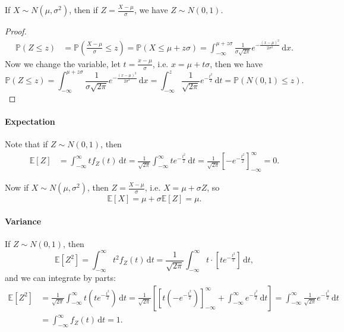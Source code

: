 \begin{claim}
    If \(X \sim N(\mu , \sigma ^2)\), then if \(Z = \frac{X - \mu}{\sigma}\), we have \(Z \sim N(0, 1)\).   
\end{claim}

\begin{proof}
    \begin{align*}
        \mathbb{P} (Z \le z) &= \mathbb{P} \left( \frac{X - \mu}{\sigma} \le z \right) = \mathbb{P} (X \le \mu + z \sigma) = \int _{-\infty }^{\mu + z \sigma} \frac{1}{\sigma \sqrt{2 \pi} } e^{-\frac{(x - \mu )^2}{2 \sigma ^2}} \, \mathrm{d} x.  
    \end{align*}
    Now we change the variable, let \(t = \frac{x - \mu}{\sigma}\), i.e. \(x = \mu + t \sigma \), then we have 
    \[
        \mathbb{P} (Z \le z) = \int _{-\infty }^{\mu + z \sigma} \frac{1}{\sigma \sqrt{2 \pi} } e^{-\frac{(x - \mu )^2}{2 \sigma ^2}} \, \mathrm{d} x = \int _{-\infty }^z \frac{1}{\sqrt{2 \pi } } e^{-\frac{t^2}{2}} \, \mathrm{d} t = \mathbb{P} (N(0, 1) \le z).  
    \]  
\end{proof}

\paragraph{Expectation}
Note that if \(Z \sim N(0, 1)\), then 
\begin{align*}
    \mathbb{E} [Z] &= \int _{-\infty }^{\infty } t f_Z(t) \, \mathrm{d} t = \frac{1}{\sqrt{2 \pi } } \int _{-\infty }^{\infty } t e^{-\frac{t^2}{2}} \, \mathrm{d} t = \frac{1}{\sqrt{2 \pi} } \left[ - e^{-\frac{t^2}{2}} \right]_{-\infty}^{\infty} = 0.   
\end{align*} 

Now if \(X \sim N(\mu , \sigma ^2)\), then \(Z = \frac{X - \mu}{\sigma}\), i.e. \(X = \mu + \sigma Z\), so 
\[
    \mathbb{E} [X] = \mu + \sigma \mathbb{E} [Z] = \mu .
\]   

\paragraph{Variance}
If \(Z \sim N(0, 1)\), then 
\[
    \mathbb{E} [Z^2] = \int _{-\infty }^{\infty } t^2 f_Z(t) \, \mathrm{d} t = \frac{1}{\sqrt{2 \pi } } \int _{-\infty }^{\infty } t \cdot \left[ t e^{-\frac{t^2}{2}} \right] \, \mathrm{d} t,   
\] 
and we can integrate by parts: 
\begin{align*}
    \mathbb{E} [Z^2] &= \frac{1}{\sqrt{2 \pi}} \int _{-\infty }^{\infty } t \left( t e^{-\frac{t^2}{2}} \right) \, \mathrm{d} t = \frac{1}{\sqrt{2 \pi} } \left[ \left[ t(-e^{-\frac{t^2}{2}}) \right]_{-\infty }^{\infty } + \int _{-\infty }^{\infty } e^{-\frac{t^2}{2}} \, \mathrm{d} t  \right] = \int _{-\infty }^{\infty } \frac{1}{\sqrt{2 \pi} } e^{-\frac{t^2}{2}} \, \mathrm{d} t \\ &= \int _{-\infty }^{\infty} f_Z(t) \, \mathrm{d} t = 1.  
\end{align*}

